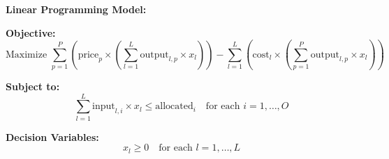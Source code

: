\documentclass{article}
\begin{document}
\textbf{Linear Programming Model:}

\textbf{Objective:}
\[
\text{Maximize } \sum_{p=1}^{P} \left( \text{price}_p \times \left( \sum_{l=1}^{L} \text{output}_{l,p} \times x_l \right) \right) - \sum_{l=1}^{L} \left( \text{cost}_l \times \left( \sum_{p=1}^{P} \text{output}_{l,p} \times x_l \right) \right)
\]

\textbf{Subject to:}
\[
\sum_{l=1}^{L} \text{input}_{l,i} \times x_l \leq \text{allocated}_i \quad \text{for each } i = 1, \ldots, O
\]

\textbf{Decision Variables:}
\[
x_l \geq 0 \quad \text{for each } l = 1, \ldots, L
\]
\end{document}
